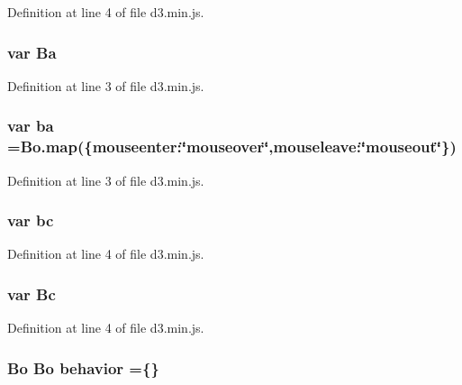 Definition at line 4 of file d3.\+min.\+js.

\subsubsection[{Ba}]{\setlength{\rightskip}{0pt plus 5cm}var Ba}\label{d3_8min_8js_ae1caccf85c7c66b4aa96144703a5fc52}


Definition at line 3 of file d3.\+min.\+js.

\subsubsection[{ba}]{\setlength{\rightskip}{0pt plus 5cm}var ba ={\bf Bo.\+map}(\{mouseenter\+:\char`\"{}mouseover\char`\"{},mouseleave\+:\char`\"{}mouseout\char`\"{}\})}\label{d3_8min_8js_aad859b228e33cbe4d01efe3b08604b0c}


Definition at line 3 of file d3.\+min.\+js.

\subsubsection[{bc}]{\setlength{\rightskip}{0pt plus 5cm}var bc}\label{d3_8min_8js_aec0c674a5d6e4436ee67c2c570aaeac6}


Definition at line 4 of file d3.\+min.\+js.

\subsubsection[{Bc}]{\setlength{\rightskip}{0pt plus 5cm}var Bc}\label{d3_8min_8js_a5c2e0a8480cde973ea703e6cef779d74}


Definition at line 4 of file d3.\+min.\+js.

\subsubsection[{behavior}]{ {\bf Bo} {\bf Bo} behavior =\{\}}\label{d3_8min_8js_a12e20dcfdcc9c1dee34f34d5360c769c}


